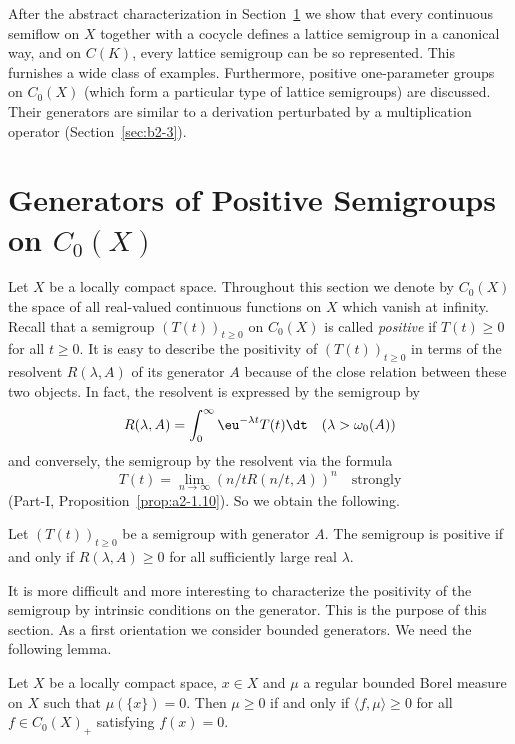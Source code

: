 After the abstract characterization in Section~\ref{sec:b2-1} we show that every continuous semiflow on $X$ together with a cocycle defines a lattice semigroup in a canonical way, and on $C(K)$, every lattice semigroup can be so represented.
This furnishes a wide class of examples.
Furthermore, positive one-parameter groups on $C_{0}(X)$ (which form a particular type of lattice semigroups) are discussed.
Their generators are similar to a derivation perturbated by a multiplication operator (Section~\ref{sec:b2-3}).

\section{Generators of Positive Semigroups on  \texorpdfstring{$C_{0}(X)$}{C_0(X)}} \label{sec:b2-1}%
Let $X$ be a locally compact space.
Throughout this section we denote by $C_{0}(X)$ the space of all real-valued continuous functions on $X$ which vanish at infinity.
Recall that a semigroup $(T(t))_{t \geq 0}$ on $C_{0}(X)$ is called \emph{positive} if\/ $T(t) \geq 0$ for all $t \geq 0$.
It is easy to describe the positivity of\/ $(T(t))_{t \geq 0}$ in terms of the resolvent $R(\lambda,A)$ of its generator $A$ because of the close relation between these two objects.
In fact, the resolvent is expressed by the semigroup by
\begin{equation}\label{eq:b2-1.1}
R(\lambda,A) = \int_{0}^{\infty} \eu^{-\lambda t} T(t) \dt \quad (\lambda > \omega_{0}(A))
\end{equation}
and conversely, the semigroup by the resolvent via the formula
\begin{equation}\label{eq:b2-1.2}
T(t) = \lim_{n \to \infty} (n/tR(n/t,A))^{n} \quad \text{strongly}
\end{equation}
(\cf Part-I, Proposition~\ref{prop:a2-1.10}).
So we obtain the following.
\begin{proposition}\label{prop:b2-1.1}%
Let $(T(t))_{t \geq 0}$ be a semigroup with generator $A$.
The semigroup is positive if and only if\/ $R(\lambda,A) \geq 0$ for all sufficiently large real $\lambda$.
\end{proposition}
It is more difficult and more interesting to characterize the positivity of the semigroup by intrinsic conditions on the generator.
This is the purpose of this section.
As a first orientation we consider bounded generators.
We need the following lemma.
\begin{lemma}\label{lem:b2-1.2}
Let $X$ be a locally compact space, $x \in X$ and $\mu$ a regular bounded Borel measure on $X$ such that $\mu(\{x\}) = 0$.
Then $\mu \geq 0$ if and only if\/ $\langle f,\mu \rangle \geq 0$ for all $f \in C_{0}(X)_{+}$ satisfying $f(x) = 0$.
\end{lemma}
